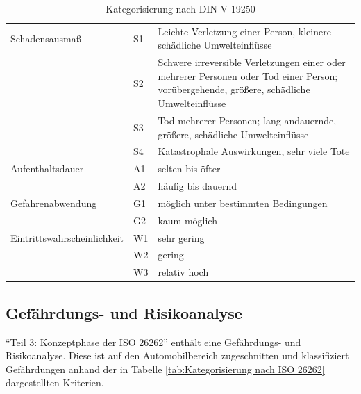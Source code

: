 \begin{table}[htpb]
	\scriptsize
	\caption[Kategorisierung nach DIN V 19250]{Kategorisierung nach DIN V 19250 \parencite[S. 52]{Hillenbrand.2012}}\label{tab:Kategorisierung nach DIN V 19250}
	\centering
	\begin{tabular}{l l p{7cm}}
		\toprule
		Schadensausmaß & S1 & Leichte Verletzung einer Person, kleinere schädliche Umwelteinflüsse\\
		 & S2 & Schwere irreversible Verletzungen einer oder mehrerer Personen oder Tod einer Person; vorübergehende, größere, schädliche Umwelteinflüsse\\
		 & S3 & Tod mehrerer Personen; lang andauernde, größere, schädliche Umwelteinflüsse\\
		 & S4 & Katastrophale Auswirkungen, sehr viele Tote\\
		\midrule
		Aufenthaltsdauer & A1 & selten bis öfter\\
		 & A2 & häufig bis dauernd\\
		 \midrule
		 Gefahrenabwendung & G1 & möglich unter bestimmten Bedingungen\\
		 & G2 & kaum möglich\\
		 \midrule
		 Eintrittswahrscheinlichkeit & W1 & sehr gering\\
		 & W2 & gering\\
		 & W3 & relativ hoch\\
		\bottomrule
	\end{tabular}
\end{table}


\subsection{Gefährdungs- und Risikoanalyse}
\enquote{Teil 3: Konzeptphase der ISO 26262} enthält eine Gefährdungs- und Risikoanalyse. Diese ist auf den Automobilbereich zugeschnitten und klassifiziert Gefährdungen anhand der in Tabelle \ref{tab:Kategorisierung nach ISO 26262} dargestellten Kriterien.

